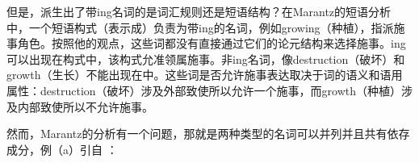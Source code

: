     但是，派生出了带ing名词的是词汇规则还是短语结构？在Marantz的\citeyearpar{Marantz97a}短语分析中，一个短语构式（表示成\vPc）负责为带ing的名词，例如growing（种植），指派施事角色。按照他的观点，这些词都没有直接通过它们的论元结构来选择施事。ing可以出现在\vPc 构式中，该构式允准领属施事。非ing名词，像destruction（破坏）和growth（生长）不能出现在\vPc 中。这些词是否允许施事表达取决于词的语义和语用属性：destruction（破坏）涉及外部致使所以允许一个施事，而growth（种植）涉及内部致使所以不允许施事。

    然而，Marantz的分析有一个问题，那就是两种类型的名词可以并列并且共有依存成分，例（a）引自 ：

